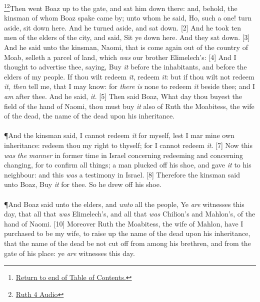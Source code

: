 \footnote{\textcolor[cmyk]{0.99998,1,0,0}{\hyperlink{TOC}{Return to end of Table of Contents.}}}\footnote{\href{https://audiobible.com/bible/ruth_4.html}{\textcolor[cmyk]{0.99998,1,0,0}{Ruth 4 Audio}}}\textcolor[cmyk]{0.99998,1,0,0}{Then went Boaz up to the gate, and sat him down there: and, behold, the kinsman of whom Boaz spake came by; unto whom he said, Ho, such a one! turn aside, sit down here. And he turned aside, and sat down.}
[2] \textcolor[cmyk]{0.99998,1,0,0}{And he took ten men of the elders of the city, and said, Sit ye down here. And they sat down.}
[3] \textcolor[cmyk]{0.99998,1,0,0}{And he said unto the kinsman, Naomi, that is come again out of the country of Moab, selleth a parcel of land, which \emph{was} our brother Elimelech's:}
[4] \textcolor[cmyk]{0.99998,1,0,0}{And I thought to advertise thee, saying, Buy \emph{it} before the inhabitants, and before the elders of my people. If thou wilt redeem \emph{it}, redeem \emph{it}: but if thou wilt not redeem \emph{it,} \emph{then} tell me, that I may know: for \emph{there} \emph{is} none to redeem \emph{it} beside thee; and I \emph{am} after thee. And he said,  \emph{it}.}
[5] \textcolor[cmyk]{0.99998,1,0,0}{Then said Boaz, What day thou buyest the field of the hand of Naomi, thou must buy \emph{it} also of Ruth the Moabitess, the wife of the dead,  the name of the dead upon his inheritance.}\\
\\
\P \textcolor[cmyk]{0.99998,1,0,0}{And the kinsman said, I cannot redeem \emph{it} for myself, lest I mar mine own inheritance: redeem thou my right to thyself; for I cannot redeem \emph{it}.}
[7] \textcolor[cmyk]{0.99998,1,0,0}{Now this \emph{was} \emph{the} \emph{manner} in former time in Israel concerning redeeming and concerning changing, for to confirm all things; a man plucked off his shoe, and gave \emph{it} to his neighbour: and this \emph{was} a testimony in Israel.}
[8] \textcolor[cmyk]{0.99998,1,0,0}{Therefore the kinsman said unto Boaz, Buy \emph{it} for thee. So he drew off his shoe.}\\
\\
\P \textcolor[cmyk]{0.99998,1,0,0}{And Boaz said unto the elders, and \emph{unto} all the people, Ye \emph{are} witnesses this day, that  all that \emph{was} Elimelech's, and all that \emph{was} Chilion's and Mahlon's, of the hand of Naomi.}
[10] \textcolor[cmyk]{0.99998,1,0,0}{Moreover Ruth the Moabitess, the wife of Mahlon, have I purchased to be my wife, to raise up the name of the dead upon his inheritance, that the name of the dead be not cut off from among his brethren, and from the gate of his place: ye \emph{are} witnesses this day.}
